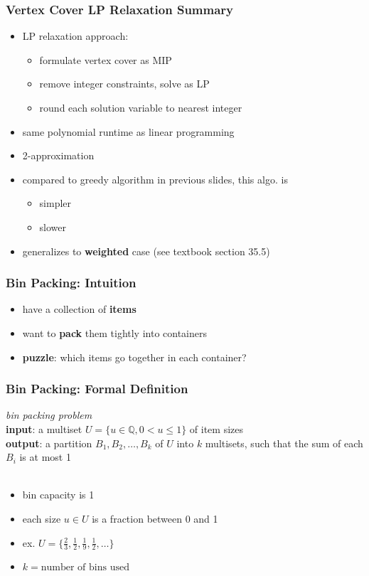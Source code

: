 \documentclass{beamer}
\newcommand{\stanza}{ \\~\ }
\begin{document}
\begin{frame} \frametitle{Vertex Cover LP Relaxation Summary}
\begin{itemize}
  \item LP relaxation approach:
    \begin{itemize}
      \item formulate vertex cover as MIP
      \item remove integer constraints, solve as LP
      \item round each solution variable to nearest integer
    \end{itemize}
  \item same polynomial runtime as linear programming
  \item 2-approximation
  \item compared to greedy algorithm in previous slides, this algo. is
  \begin{itemize}
    \item simpler
    \item slower
  \end{itemize}
  \item generalizes to \textbf{weighted} case (see textbook section 35.5)
\end{itemize}
\end{frame}

\begin{frame} \frametitle{Bin Packing: Intuition}
  \begin{itemize}
    \item have a collection of \textbf{items}
    \item want to \textbf{pack} them tightly into containers
    \item \textbf{puzzle}: which items go together in each container?
  \end{itemize}
\end{frame}

\begin{frame} \frametitle{Bin Packing: Formal Definition}
  \emph{bin packing problem} \\
  \textbf{input}: a multiset $U = \{u \in \mathbb{Q}, 0 < u\leq 1\}$ of item sizes \\
  \textbf{output}: a partition $B_1, B_2, \ldots, B_k$ of $U$ into $k$ multisets, such that the sum of each $B_i$ is at most 1
  \stanza

  \begin{itemize}
    \item bin capacity is 1
    \item each size $u \in U$ is a fraction between 0 and 1
    \item ex. $U=\{\frac{2}{3}, \frac{1}{2}, \frac{1}{9}, \frac{1}{2}, \ldots \}$
    \item $k = \text{number of bins used}$
  \end{itemize}
\end{frame}
\end{document}
